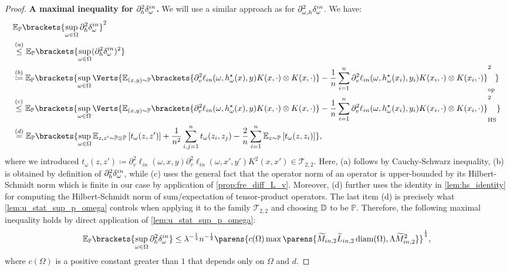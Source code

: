 \begin{proof}
{\bf A maximal inequality for $\partial_{h}^2\delta_\omega^{in}$.} We will use a similar approach as for $\partial_{\omega,h}^2\delta_\omega^{in}$. We have:
\begin{align*}
	&\mathbb{E}_{\mathbb{P}}\brackets{\sup_{\omega\in \Omega} \Dinhh }^2\\
	&\stackrel{(a)}{\leq} \mathbb{E}_{\mathbb{P}}\brackets{\sup_{\omega\in \Omega} (\Dinhh)^2 }\\
	&\stackrel{(b)}{\coloneqq} \mathbb{E}_{\mathbb{P}}\brackets{ \sup_{\omega\in \Omega} \Verts{ \mathbb{E}_{(x,y)\sim \mathbb{P}}\brackets{\partial_{v}^2\ell_{in}(\omega,h_{\omega}^{\star}(x),y)K(x,\cdot)\otimes K(x,\cdot)} - \frac{1}{n}\sum_{i=1}^n \partial_{v}^2\ell_{in}(\omega,h_{\omega}^{\star}(x_i),y_i)K(x_i,\cdot)\otimes K(x_i,\cdot) }_{\op}^2 }\\
	&\stackrel{(c)}{\leq}\mathbb{E}_{\mathbb{P}}\brackets{ \sup_{\omega\in \Omega} \Verts{ \mathbb{E}_{(x,y)\sim \mathbb{P}}\brackets{\partial_{v}^2\ell_{in}(\omega,h_{\omega}^{\star}(x),y)K(x,\cdot)\otimes K(x,\cdot)} - \frac{1}{n}\sum_{i=1}^n \partial_{v}^2\ell_{in}(\omega,h_{\omega}^{\star}(x_i),y_i)K(x_i,\cdot)\otimes K(x_i,\cdot) }_{\hs}^2 }\\
	&\stackrel{(d)}{=} \mathbb{E}_{\mathbb{P}}\brackets{\sup_{\omega\in \Omega} \mathbb{E}_{z,z'\sim\mathbb{P}\otimes\mathbb{P}}\left[t_\omega(z,z')\right]+\frac{1}{n^2}\sum_{i,j=1}^n t_\omega(z_i,z_j)-\frac{2}{n}\sum_{i=1}^n\mathbb{E}_{z\sim\mathbb{P}}\left[t_\omega(z,z_i)\right]},
\end{align*}
where we introduced $t_{\omega}(z,z')\coloneqq\partial_{v}^2\ell_{in}(\omega,x,y)\partial_{v}^2\ell_{in}(\omega,x',y')K^2(x,x')\in \mathcal{T}_{2,2}$. Here, (a) follows by Cauchy-Schwarz inequality, (b) is obtained by definition of $\partial_{h}^2\delta_\omega^{in}$, while (c) uses the general fact that the operator norm of an operator is upper-bounded by its Hilbert-Schmidt norm which is finite in our case by application of \cref{prop:fre_diff_L_v}. Moreover, (d) further uses the identity in \cref{lem:hs_identity} for computing the Hilbert-Schmidt norm of sum/expectation of tensor-product operators. 
The last item (d) is precisely what \cref{lem:u_stat_sup_p_omega} controls when applying it to the family $\mathcal{T}_{2,2}$  and choosing $\mathbb{D}$ to be $\mathbb{P}$.  Therefore, the following maximal inequality holds by direct application of \cref{lem:u_stat_sup_p_omega}:
 \begin{align*}
 	\mathbb{E}_{\mathbb{P}}\brackets{\sup_{\omega\in \Omega} \Dinhh }\leq 
 	\lambda^{-\frac{1}{4}}n^{-\frac{1}{2}} \parens{c(\Omega)\max\parens{\widetilde{M}_{in,2}\widetilde{L}_{in,2}\diam(\Omega),\Lambda\widetilde{M}^2_{in,2}}}^{\frac{1}{4}},
 \end{align*}
 where $c(\Omega)$ is a positive constant greater than $1$ that depends only on $\Omega$ and $d$.
\end{proof}
